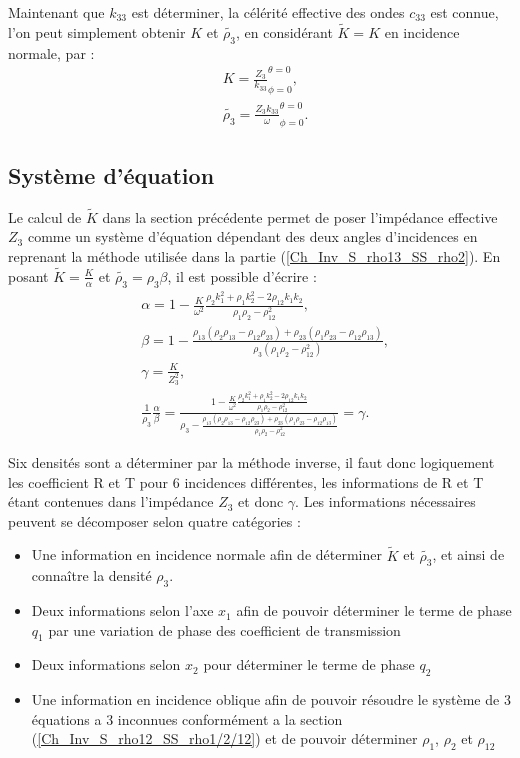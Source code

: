\documentclass[12pt]{report}
\begin{document}
    Maintenant que $k_{33}$ est déterminer, la célérité effective des ondes $c_{33}$ est connue, l'on peut simplement obtenir $K$ et $\tilde{\rho_3}$, en considérant $\tilde{K}=K$ en incidence normale, par :
    \begin{align*}
    &K=\frac{Z_3}{k_{33}}^{\theta=0}_{\phi=0},\\
    &\tilde{\rho_3}=\frac{Z_3 k_{33}}{\omega}^{\theta=0}_{\phi=0}.
    \end{align*}
    
\subsection{Système d'équation}
	Le calcul de $\tilde{K}$ dans la section précédente permet de poser l'impédance effective $Z_3$ comme un système d'équation dépendant des deux angles d'incidences en reprenant la méthode utilisée dans la partie (\ref{Ch_Inv_S_rho13_SS_rho2}). En posant $\tilde{K}=\frac{K}{\alpha}$ et $\tilde{\rho_3}=\rho_3 \beta$, il est possible d'écrire :
    \begin{align}
    &\alpha=1-\frac{K}{\omega^2}\frac{\rho_2 k_1^2+\rho_1 k_2^2-2\rho_{12}k_1k_2}{\rho_1\rho_2-\rho_{12}^2},\nonumber \\
    &\beta=1-\frac{\rho_{13}(\rho_2\rho_{13}-\rho_{12}\rho_{23})+\rho_{23}(\rho_1\rho_{23}-\rho_{12}\rho_{13})}{\rho_3(\rho_1\rho_2-\rho_{12}^2)},\nonumber \\
    &\gamma=\frac{K}{Z_3^2},\nonumber \\
    &\frac{1}{\rho_3}\frac{\alpha}{\beta}=\frac{1-\frac{K}{\omega^2}\frac{\rho_2 k_1^2+\rho_1 k_2^2-2\rho_{12}k_1k_2}{\rho_1\rho_2-\rho_{12}^2}}{\rho_3-\frac{\rho_{13}(\rho_2\rho_{13}-\rho_{12}\rho_{23})+\rho_{23}(\rho_1\rho_{23}-\rho_{12}\rho_{13})}{\rho_1\rho_2-\rho_{12}^2}}=\gamma.\label{alpha_beta_complet}
    \end{align}
    
    Six densités sont a déterminer par la méthode inverse, il faut donc logiquement les coefficient R et T pour 6 incidences différentes, les informations de R et T étant contenues dans l'impédance $Z_3$ et donc $\gamma$. 
	Les informations nécessaires peuvent se décomposer selon quatre catégories :
    \begin{itemize}
    \item Une information en incidence normale afin de déterminer $\tilde{K}$ et $\tilde{\rho_3}$, et ainsi de connaître la densité $\rho_3$. 
    \item Deux informations selon l'axe $x_1$ afin de pouvoir déterminer le terme de phase $q_1$ par une variation de phase des coefficient de transmission
    \item Deux informations selon $x_2$ pour déterminer le terme de phase $q_2$
    \item Une information en incidence oblique afin de pouvoir résoudre le système de 3 équations a 3 inconnues conformément a la section (\ref{Ch_Inv_S_rho12_SS_rho1/2/12}) et de pouvoir déterminer $\rho_1$, $\rho_2$ et $\rho_{12}$ 
    \end{itemize}
    
\end{document}
